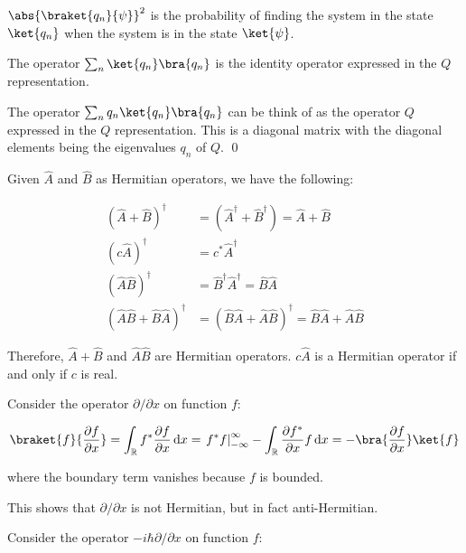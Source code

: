 \documentclass[12pt]{article}
\begin{document}
$\abs{\braket{q_{n}}{\psi}}^2$ is the probability of finding the system in the state $\ket{q_n}$ when the system is in the state $\ket{\psi}$.

The operator $\sum_{n} \ket{q_{n}} \bra{q_{n}}$ is the identity operator expressed in the $Q$ representation.

The operator $\sum_{n} q_{n} \ket{q_{n}} \bra{q_{n}}$ can be think of as the operator $Q$ expressed in the $Q$ representation. This is a diagonal matrix with the diagonal elements being the eigenvalues $q_{n}$ of $Q$.
\qed


Given $\hat{A}$ and $\hat{B}$ as Hermitian operators, we have the following:

\begin{equation}
    \begin{split}
        \left( \hat{A} + \hat{B} \right)^{\dagger} &= \left( \hat{A}^{\dagger} + \hat{B}^{\dagger} \right) = \hat{A} + \hat{B} \\
        \left( c \hat{A} \right)^{\dagger} &= c^{*} \hat{A}^{\dagger} \\
        \left( \hat{A} \hat{B} \right)^{\dagger} &= \hat{B}^{\dagger} \hat{A}^{\dagger} = \hat{B} \hat{A} \\
        \left( \hat{A} \hat{B} + \hat{B} \hat{A} \right)^{\dagger} &= \left( \hat{B} \hat{A} + \hat{A} \hat{B} \right)^{\dagger} = \hat{B} \hat{A} + \hat{A} \hat{B}
    \end{split}
\end{equation}

Therefore, $\hat{A} + \hat{B}$ and $\hat{A} \hat{B}$ are Hermitian operators. $c \hat{A}$ is a Hermitian operator if and only if $c$ is real.

Consider the operator $\partial /\partial x$ on function $f$:

\begin{equation}
    \braket{f}{\frac{\partial f}{\partial x}} = \int_{\mathbb{R}} f^{*} \frac{\partial f}{\partial x} \, \mathrm{d}x = \left. f^{*} f \right|_{-\infty}^{\infty} - \int_{\mathbb{R}} \frac{\partial f^{*}}{\partial x} f \, \mathrm{d}x = - \bra{\frac{\partial f}{\partial x}} \ket{f}
\end{equation}

where the boundary term vanishes because $f$ is bounded.

This shows that $\partial /\partial x$ is not Hermitian, but in fact anti-Hermitian.

Consider the operator $-i\hbar \partial /\partial x$ on function $f$:
\end{document}
